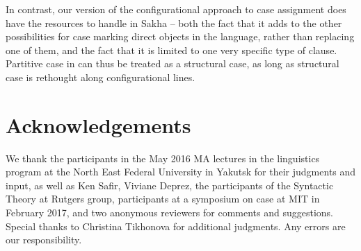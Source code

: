 \documentclass[output=paper]{langsci/langscibook}
\begin{document}
In contrast, our version of the configurational approach to case assignment
does have the resources to handle  in Sakha -- both the
fact that it adds to the other possibilities for case marking direct objects in
the language, rather than replacing one of them, and the fact that it is
limited to one very specific type of clause. Partitive case in  can
thus be treated as a structural case, as long as structural case is rethought
along configurational lines.

\printchapterglossary{}

\section*{Acknowledgements}

We thank the participants in the May 2016 MA lectures in the linguistics
program at the North East Federal University in Yakutsk for their judgments and
input, as well as Ken Safir, Viviane Deprez, the participants of the Syntactic
Theory at Rutgers group, participants at a symposium on case at MIT in February
2017, and two anonymous reviewers for comments and suggestions. Special thanks
to Christina Tikhonova for additional  judgments. Any errors are our
responsibility.

{\sloppy
\printbibliography[heading=subbibliography,notkeyword=this]
}
\end{document}
